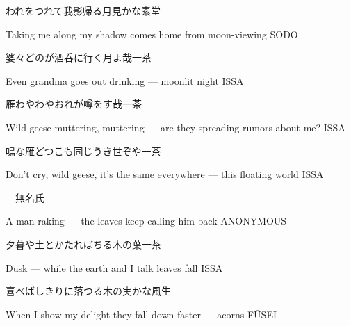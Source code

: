 \begin{haiku}
    {\FH われをつれて我影帰る月見かな}\hfill{\FH 素堂}

    \vin{} Taking me along
    \vin{} \vin{} my shadow comes home
    \vin{} \vin{} \vin{} from moon-viewing \hspace{\fill} SOD\={O}
\end{haiku}

\begin{haiku}
    {\FH 婆々どのが酒呑に行く月よ哉}\hfill{\FH 一茶}

    \vin{} Even grandma
    \vin{} \vin{} goes out drinking ---
    \vin{} \vin{} \vin{} moonlit night \hspace{\fill} ISSA
\end{haiku}

\begin{haiku}
    {\FH 雁わやわやおれが噂をす哉}\hfill{\FH 一茶}

    \vin{} Wild geese muttering, muttering ---
    \vin{} \vin{} are they spreading
    \vin{} \vin{} \vin{} rumors about me? \hspace{\fill} ISSA
\end{haiku}

\begin{haiku}
    {\FH 鳴な雁どつこも同じうき世ぞや}\hfill{\FH 一茶}

    \vin{} Don't cry, wild geese,
    \vin{} \vin{} it's the same everywhere ---
    \vin{} \vin{} \vin{} this floating world \hspace{\fill} ISSA
\end{haiku}

\begin{haiku}
    {---}\hfill{\FH 無名氏}

    \vin{} A man raking ---
    \vin{} \vin{} the leaves keep
    \vin{} \vin{} \vin{} calling him back \hspace{\fill} ANONYMOUS
\end{haiku}

\begin{haiku}
    {\FH 夕暮や土とかたればちる木の葉}\hfill{\FH 一茶}

    \vin{} Dusk ---
    \vin{} \vin{} while the earth and I talk
    \vin{} \vin{} \vin{} leaves fall \hspace{\fill} ISSA
\end{haiku}

\begin{haiku}
    {\FH 喜べばしきりに落つる木の実かな}\hfill{\FH 風生}

    \vin{} When I show my delight
    \vin{} \vin{} they fall down faster ---
    \vin{} \vin{} \vin{} acorns \hspace{\fill} F\={U}SEI
\end{haiku}

